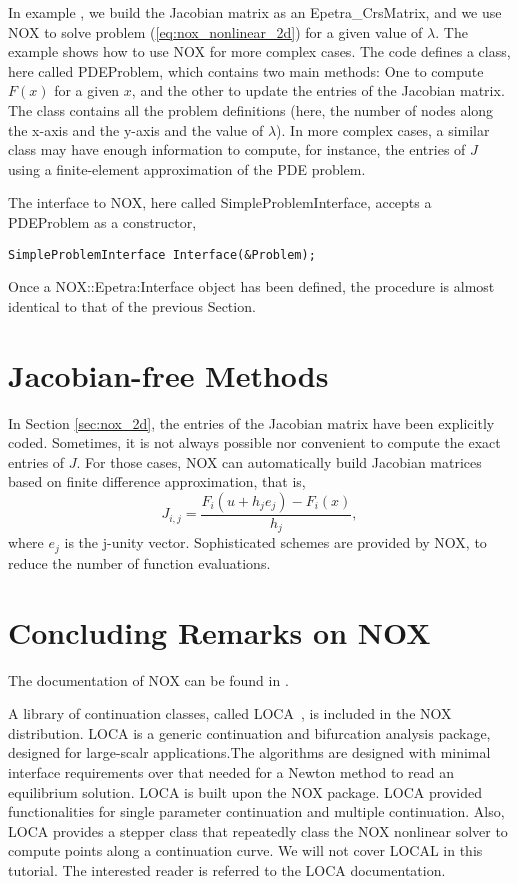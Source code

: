 In example , we build the Jacobian matrix as an
Epetra\_CrsMatrix, and we use NOX to solve problem
(\ref{eq:nox_nonlinear_2d}) for a given value of $\lambda$.  The example
shows how to use NOX for more complex cases. The code defines a class,
here called PDEProblem, which contains two main methods: One to compute
$F(x)$ for a given $x$, and the other to update the entries of the
Jacobian matrix. The class contains all the problem definitions (here,
the number of nodes along the x-axis and the y-axis and the value of
$\lambda$). In more complex cases, a similar class may have enough
information to compute, for instance, the entries of $J$ using a
finite-element approximation of the PDE problem.

The interface to NOX, here called SimpleProblemInterface, accepts a
PDEProblem as a constructor,
\begin{verbatim}
SimpleProblemInterface Interface(&Problem);
\end{verbatim}
Once a NOX::Epetra:Interface object has been defined, the procedure is
almost identical to that of the previous Section.


\section{Jacobian-free Methods}
\label{sec:nox_jacobian_free}

In Section \ref{sec:nox_2d}, the entries of the Jacobian matrix have
been explicitly coded. Sometimes, it is not always possible nor
convenient to compute the exact entries of $J$.  For those cases, NOX
can automatically build Jacobian matrices based on finite difference
approximation, that is,
\[
J_{i,j} = \frac{F_i(u + h_j e_j) - F_i(x)}{h_j} ,
\] 
where $e_j$ is the j-unity vector. Sophisticated schemes are provided by
NOX, to reduce the number of function evaluations.


\section{Concluding Remarks on NOX}
\label{sec:local}

The documentation of NOX can be found in \cite{NOX-home-page}.

A library of continuation classes, called
LOCA~\cite{LOCA-manual,LOCA-MPSalsa-paper}, is included in the NOX
distribution. LOCA is a generic continuation and bifurcation analysis
package, designed for large-scalr applications.The algorithms are
designed with minimal interface requirements over that needed for a
Newton method to read an equilibrium solution. LOCA is built upon the
NOX package. LOCA provided functionalities for single parameter
continuation and multiple continuation. Also, LOCA provides a stepper
class that repeatedly class the NOX nonlinear solver to compute points
along a continuation curve. We will not cover LOCAL in this tutorial.
The interested reader is referred to the LOCA documentation.

